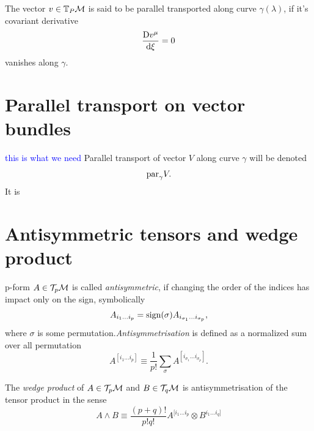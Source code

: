 The vector $v\in \mathbb{T}_P\mathcal{M}$ is said to be parallel transported along curve $\gamma(\lambda)$, if it's covariant derivative
\begin{equation}
    \frac{\mathrm{D} v^\mu}{\mathrm{d} \xi}=0
\end{equation}
vanishes along $\gamma$.

\section{Parallel transport on vector bundles}
\textcolor{blue}{this is what we need}
Parallel transport of vector $V$ along curve $\gamma$ will be denoted
$$\textrm{par}_\gamma V.$$
It is 


\section{Antisymmetric tensors and wedge product}
p-form $A\in \mathcal{T}_p \mathcal{M}$ is called \emph{antisymmetric}, if changing the order of the indices has impact only on the sign, symbolically
$$A_{i_1\dots i_p} = \operatorname{\textrm{sign}}(\sigma)A_{i_{\sigma_1}\dots i_{\sigma_p}},$$
where $\sigma$ is some permutation.\emph{Antisymmetrisation} is defined as a normalized sum over all permutation
\begin{equation}
    A^{[i_1\dots i_p]}\equiv \frac{1}{p!}\sum_\sigma A^{[i_{\sigma_1}\dots i_{\sigma_p}]}. 
\end{equation}

The \emph{wedge product} of $A\in \mathcal{T}_p \mathcal{M}$ and $B\in \mathcal{T}_q \mathcal{M}$ is antisymmetrisation of the tensor product in the sense
\begin{equation}
    A\wedge B\equiv \frac{(p+q)!}{p!q!} A^{[i_1\dots i_p}\otimes B^{i_1\dots i_q]}
\end{equation}

